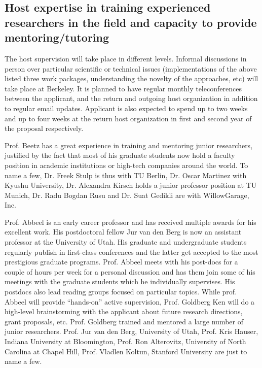 \subsection{Host expertise in training  experienced researchers in the field and capacity to provide 
mentoring/tutoring} 
The host supervision will take place in different levels. Informal discussions in person over
particular scientific or technical issues (implementations of the above listed three 
work packages, understanding the novelty of the approaches, etc) will take place
at Berkeley. It is planned to have regular monthly teleconferences between the applicant, 
and the return and outgoing host organization in addition to regular email
updates. Applicant is also expected to spend up to two weeks and up to four weeks
at the return host organization in first and second year of the proposal respectively.

Prof. Beetz has a great experience in training and mentoring junior researchers, justified 
by the fact that most of his graduate students now hold a faculty position in academic 
institutions or high-tech companies around the world. To name a few, Dr. Freek Stulp is thus with TU Berlin, 
Dr. Oscar Martinez with Kyushu University, Dr. Alexandra Kirsch holds a junior professor position at 
TU Munich, Dr. Radu Bogdan Rusu and Dr. Suat Gedikli are with WillowGarage, Inc.

Prof. Abbeel is an early career professor and has received multiple awards for his excellent work.
His postdoctoral fellow Jur van den Berg is now an assistant professor at the University of Utah.
His graduate and undergraduate students regularly publish in first-class conferences and the latter
get accepted to the most prestigious graduate programs. Prof. Abbeel meets with his post-docs for 
a couple of hours per week for a personal discussion and has them join some of his meetings with 
the graduate students which he individually supervises. His postdocs also lead reading groups
focused on particular topics. While prof. Abbeel will provide ``hands-on''
active supervision, Prof. Goldberg Ken will do a high-level brainstorming with the applicant about 
future research directions, grant proposals, etc. Prof. Goldberg trained and mentored a large number
of junior researchers. Prof. Jur van den Berg, University of Utah, Prof. Kris Hauser, Indiana University at Bloomington, 
Prof. Ron Alterovitz, University of North Carolina at Chapel Hill, Prof.  Vladlen Koltun, Stanford University
are just to name a few.

